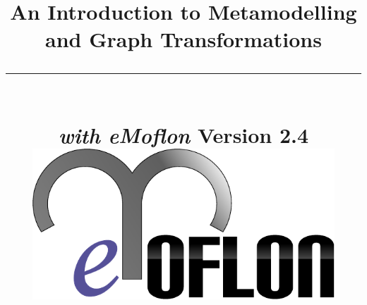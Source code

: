 \title{
\flushright
{\LARGE\bfseries An Introduction to Metamodelling\\
and Graph Transformations}
\noindent\rule[-1ex]{\textwidth}{5pt}\\[2.5ex]
\hfill\emph{\LARGE\bfseries with eMoflon}
\flushleft
{\small Version 2.4}
\flushright
\includegraphics[width=0.85\textwidth]{pics/eMoflon3} 
}

\date{}  
\author{} 